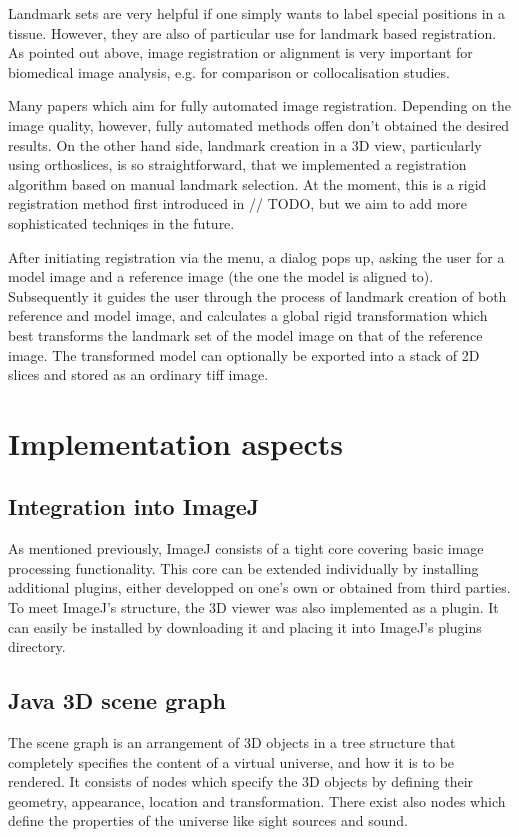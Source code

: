 \documentclass[a4paper,10pt]{article}
\begin{document}
Landmark sets are very helpful if one simply wants to label special positions in a tissue. However, they are also of particular use for landmark based registration. As pointed out above, image registration or alignment is very important for biomedical image analysis, e.g. for comparison or collocalisation studies. 

Many papers which aim for fully automated image registration. Depending on the image quality, however, fully automated methods offen don't obtained the desired results. On the other hand side, landmark creation in a 3D view, particularly using orthoslices, is so straightforward, that we implemented a registration algorithm based on manual landmark selection. At the moment, this is a rigid registration method first introduced in // TODO, but we aim to add more sophisticated techniqes in the future.

After initiating registration via the menu, a dialog pops up, asking the user for a model image and a reference image (the one the model is aligned to). Subsequently it guides the user through the process of landmark creation of both reference and model image, and calculates a global rigid transformation which best transforms the landmark set of the model image on that of the reference image. The transformed model can optionally be exported into a stack of 2D slices and stored as an ordinary tiff image.



\section{Implementation aspects}
\subsection*{Integration into ImageJ}
As mentioned previously, ImageJ consists of a tight core covering basic image processing functionality. This core can be extended individually by installing additional plugins, either developped on one's own or obtained from third parties.
To meet ImageJ's structure, the 3D viewer was also implemented as a plugin. It can easily be installed by downloading it and placing it into ImageJ's plugins directory.

\subsection*{Java 3D scene graph}
The scene graph is an arrangement of 3D objects in a tree structure that completely specifies the content of a virtual universe, and how it is to be rendered. It consists of nodes which specify the 3D objects by defining their geometry, appearance, location and transformation. There exist also nodes which define the properties of the universe like sight sources and sound. \cite{java3dtut}
\end{document}
